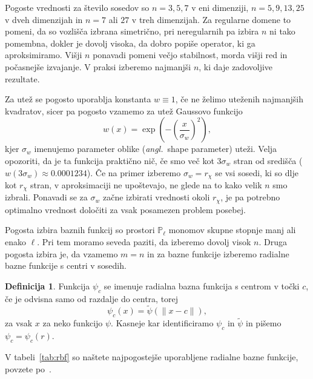 \documentclass[12pt,a4paper,twoside]{article}
\theoremstyle{definition} %
\newtheorem{definicija}{Definicija}[section]
\theoremstyle{plain} %
\numberwithin{equation}{section}
\newcommand{\ang}[1]{(\textit{angl.}\ #1)}
\begin{document}
Pogoste vrednosti za število sosedov so $n = 3, 5, 7$ v eni dimenziji, $n = 5,
9, 13, 25$ v dveh dimenzijah in $n = 7$ ali $27$ v treh dimenzijah. Za regularne
domene to pomeni, da so vozlišča izbrana simetrično, pri neregularnih pa izbira
$n$ ni tako pomembna, dokler je dovolj visoka, da dobro popiše operator, ki ga
aproksimiramo.  Višji $n$ ponavadi pomeni večjo stabilnost, morda višji red in
počasnejše izvajanje. V praksi izberemo najmanjši $n$, ki daje zadovoljive
rezultate.

Za utež se pogosto uporablja konstanta $w\equiv1$, če ne želimo uteženih
najmanjših kvadratov, sicer pa pogosto vzamemo za utež Gaussovo funkcijo
\[
  w(x) = \exp\left(-\left(\frac{x}{\sigma_w}\right)^2 \right),
\]
kjer $\sigma_w$ imenujemo parameter oblike \ang{shape parameter} uteži.
Velja opozoriti, da je ta funkcija praktično nič, če smo več kot $3\sigma_w$
stran od središča ($w(3\sigma_w) \approx 0.0001234$). Če na primer izberemo
$\sigma_w = r_\chi$ se vsi sosedi, ki so dlje kot $r_\chi$ stran, v
aproksimaciji ne upoštevajo, ne glede na to kako velik $n$ smo izbrali.
Ponavadi se za $\sigma_w$ začne izbirati vrednosti okoli $r_\chi$, je
pa potrebno optimalno vrednost določiti za vsak posamezen problem posebej.

Pogosta izbira baznih funkcij so prostori $\mathbb{P}_\ell$ monomov skupne
stopnje manj ali enako $\ell$. Pri tem moramo seveda paziti, da izberemo dovolj
visok $n$. Druga pogosta izbira je, da vzamemo $m = n$ in za bazne funkcije
izberemo radialne bazne funkcije s centri v sosedih.

\begin{definicija}
  Funkcija $\psi_c$ se imenuje radialna bazna funkcija s centrom v točki
  $c$,
  če je odvisna samo od razdalje do centra, torej \[
    \psi_c(x) = \tilde\psi(\|x - c\|),
  \]
  za vsak $x$ za neko funkcijo $\psi$. Kasneje kar identificiramo $\psi_c$
  in $\tilde\psi$ in pišemo $\psi_c = \psi_c(r)$.
\end{definicija}

V tabeli~\ref{tab:rbf} so naštete najpogostejše uporabljene radialne bazne funkcije, povzete
po~\cite[str.\ 5]{schaback1995error}.
\end{document}

